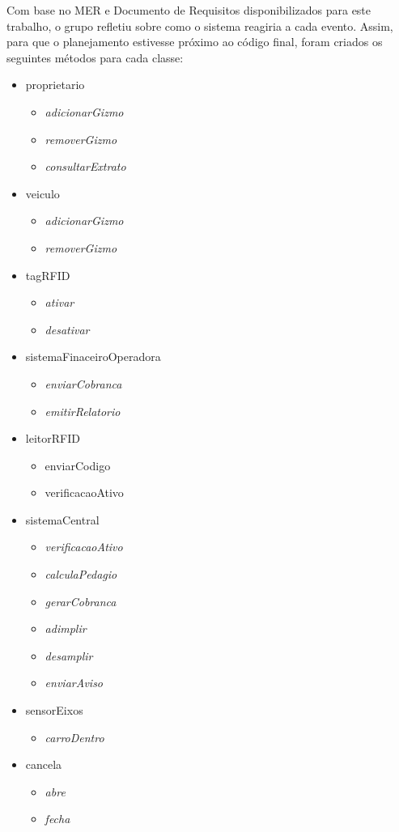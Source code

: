 \documentclass[
10pt, %
a4paper, %
oneside, %
headinclude,footinclude, %
BCOR5mm, %
]{scrartcl}
\begin{document}
Com base no MER e Documento de Requisitos disponibilizados para este
trabalho, o grupo refletiu sobre como o sistema reagiria a cada evento.
Assim, para que o planejamento estivesse próximo ao código final, foram
criados os seguintes métodos para cada classe:
\begin{itemize}[noitemsep]
	\item proprietario 
		\begin{itemize}[noitemsep]
			\item \textit{adicionarGizmo}
			\item \textit{removerGizmo}
			\item \textit{consultarExtrato}
		\end{itemize}
	\item veiculo
		\begin{itemize}[noitemsep]
			\item \textit{adicionarGizmo}
			\item \textit{removerGizmo}
		\end{itemize}
	\item tagRFID
		\begin{itemize}[noitemsep]
			\item \textit{ativar}
			\item \textit{desativar}
		\end{itemize}
	\item sistemaFinaceiroOperadora 
		\begin{itemize}[noitemsep]
			\item \textit{enviarCobranca}
			\item \textit{emitirRelatorio}
		\end{itemize}
	\item leitorRFID 
		\begin{itemize}[noitemsep]
			\item enviarCodigo
			\item verificacaoAtivo
		\end{itemize}
	\item sistemaCentral 
		\begin{itemize}[noitemsep]
			\item \textit{verificacaoAtivo}
			\item \textit{calculaPedagio}
			\item \textit{gerarCobranca}
			\item \textit{adimplir}
			\item \textit{desamplir}
			\item \textit{enviarAviso}
		\end{itemize}
	\item sensorEixos
		\begin{itemize}[noitemsep]
			\item \textit{carroDentro}
		\end{itemize}
	\item cancela 
		\begin{itemize}[noitemsep]
			\item \textit{abre}
			\item \textit{fecha}
		\end{itemize}
\end{itemize}
\end{document}
